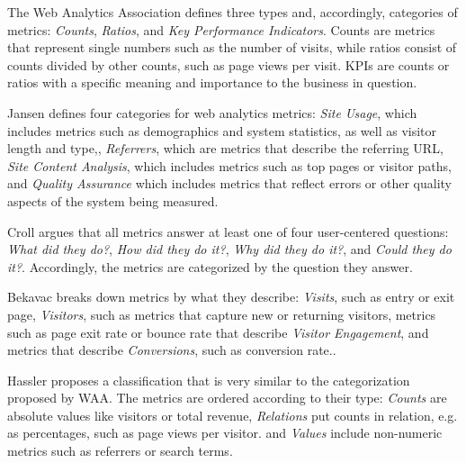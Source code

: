 
The Web Analytics Association defines three types and, accordingly, categories of metrics: \textit{Counts}, \textit{Ratios}, and \textit{Key Performance Indicators}. %
Counts are metrics that represent single numbers such as the number of visits, while ratios consist of counts divided by other counts, such as page views per visit.
KPIs are counts or ratios with a specific meaning and importance to the business in question.

Jansen defines four categories for web analytics metrics: %
\textit{Site Usage}, which includes metrics such as demographics and system statistics, as well as visitor length and type,,
\textit{Referrers}, which are metrics that describe the referring URL,
\textit{Site Content Analysis}, which includes metrics such as top pages or visitor paths, and
\textit{Quality Assurance} which includes metrics that reflect errors or other quality aspects of the system being measured.


Croll argues that all metrics answer at least one of four user-centered questions: \textit{What did they do?}, \textit{How did they do it?}, \textit{Why did they do it?}, and \textit{Could they do it?}. %
Accordingly, the metrics are categorized by the question they answer.

Bekavac breaks down metrics by what they describe: \textit{Visits}, such as entry or exit page,
\textit{Visitors}, such as metrics that capture new or returning visitors,
metrics such as page exit rate or bounce rate that describe \textit{Visitor Engagement},
and metrics that describe \textit{Conversions}, such as conversion rate.. %


Hassler proposes a classification that is very similar to the categorization proposed by WAA.
The metrics are ordered according to their type: %
\textit{Counts} are absolute values like visitors or total revenue,
\textit{Relations} put counts in relation, e.g. as percentages, such as page views per visitor.
and \textit{Values} include non-numeric metrics such as referrers or search terms.


